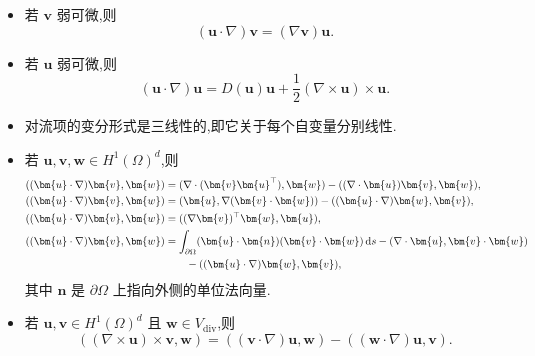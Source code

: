 \begin{lemma}[对流项的基本性质]\label{lem:steady-ns-convection-properties}
\begin{itemize}
  \item 若 $\bm{v}$ 弱可微,则
  \begin{equation}\label{eq:steady-ns-convection-gradient}
    (\bm{u}\cdot\nabla)\bm{v}=(\nabla\bm{v})\bm{u}.
  \end{equation}
  \item 若 $\bm{u}$ 弱可微,则
  \begin{equation}\label{eq:steady-ns-convection-strain-curl}
    (\bm{u}\cdot\nabla)\bm{u}
      =D(\bm{u})\bm{u}
       +\frac12(\nabla\times\bm{u})\times\bm{u}.
  \end{equation}
  \item 对流项的变分形式是三线性的,即它关于每个自变量分别线性.
  \item 若 $\bm{u},\bm{v},\bm{w}\in H^1(\Omega)^d$,则
  \begin{align}
    ((\bm{u}\cdot\nabla)\bm{v},\bm{w})
      &=(\nabla\cdot(\bm{v}\bm{u}^{\top}),\bm{w})
        -((\nabla\cdot\bm{u})\bm{v},\bm{w}),
        \label{eq:steady-ns-conv-form-1}\\
    ((\bm{u}\cdot\nabla)\bm{v},\bm{w})
      &=(\bm{u},\nabla(\bm{v}\cdot\bm{w}))
        -((\bm{u}\cdot\nabla)\bm{w},\bm{v}),
        \label{eq:steady-ns-conv-form-2}\\
    ((\bm{u}\cdot\nabla)\bm{v},\bm{w})
      &=((\nabla\bm{v})^{\top}\bm{w},\bm{u}),
        \label{eq:steady-ns-conv-form-3}\\
    ((\bm{u}\cdot\nabla)\bm{v},\bm{w})
      &=\int_{\partial\Omega}(\bm{u}\cdot\bm{n})
          (\bm{v}\cdot\bm{w})\,\mathrm{d}s
        -(\nabla\cdot\bm{u},\bm{v}\cdot\bm{w})\notag\\
      &\qquad-((\bm{u}\cdot\nabla)\bm{w},\bm{v}),
        \label{eq:steady-ns-conv-form-4}
  \end{align}
  其中 $\bm{n}$ 是 $\partial\Omega$ 上指向外侧的单位法向量.
  \item 若 $\bm{u},\bm{v}\in H^1(\Omega)^d$ 且 $\bm{w}\in V_{\mathrm{div}}$,则
  \begin{equation}\label{eq:steady-ns-rot-conv-identity}
    ((\nabla\times\bm{u})\times\bm{v},\bm{w})
      =((\bm{v}\cdot\nabla)\bm{u},\bm{w})
       -((\bm{w}\cdot\nabla)\bm{u},\bm{v}).
  \end{equation}
\end{itemize}
\end{lemma}

